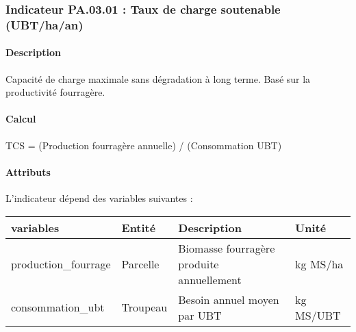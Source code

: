 \documentclass[
]{article}
\newenvironment{Shaded}{\begin{snugshade}}{\end{snugshade}}
\newcommand{\NormalTok}[1]{#1}
\begin{document}
\subsubsection{Indicateur PA.03.01 : Taux de charge soutenable
(UBT/ha/an)}\label{indicateur-pa.03.01-taux-de-charge-soutenable-ubthaan}

\paragraph{Description}\label{description-2}

Capacité de charge maximale sans dégradation à long terme. Basé sur la
productivité fourragère.

\paragraph{Calcul}\label{calcul-2}

\begin{Shaded}
\begin{Highlighting}[]
\NormalTok{TCS = (Production fourragère annuelle) / (Consommation UBT)}
\end{Highlighting}
\end{Shaded}

\paragraph{Attributs}\label{attributs-20}

L'indicateur dépend des variables suivantes :

\begin{longtable}[]{@{}
  >{\raggedright\arraybackslash}p{}
  >{\raggedright\arraybackslash}p{}
  >{\raggedright\arraybackslash}p{}
  >{\raggedright\arraybackslash}p{}@{}}
\toprule\noalign{}
\begin{minipage}[b]{\linewidth}\raggedright
\textbf{variables}
\end{minipage} & \begin{minipage}[b]{\linewidth}\raggedright
\textbf{Entité}
\end{minipage} & \begin{minipage}[b]{\linewidth}\raggedright
\textbf{Description}
\end{minipage} & \begin{minipage}[b]{\linewidth}\raggedright
\textbf{Unité}
\end{minipage} \\
\midrule\noalign{}
\endhead
\bottomrule\noalign{}
\endlastfoot
production\_fourrage & Parcelle & Biomasse fourragère produite
annuellement & kg MS/ha \\
consommation\_ubt & Troupeau & Besoin annuel moyen par UBT & kg
MS/UBT \\
\end{longtable}
\end{document}
